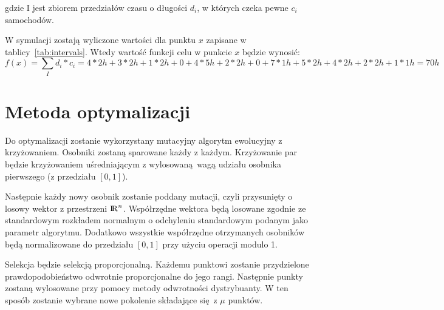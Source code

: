 \documentclass[a4paper]{article}
\begin{document}
gdzie I jest zbiorem przedziałów czasu o długości $d_i$, w których czeka pewne $c_i$
samochodów.

\begin{table}[ht]
    \centering
    \caption{Zbiór przedziałów czasowych $I$ wraz z ich długością $d_i$ oraz
    liczbą czekających samochodów $c_i$, dla punktu $x=(0.375, 0.625, 0.5)$\label{tab:intervals}.}
\end{table}

W symulacji zostają wyliczone wartości dla punktu $x$ zapisane w tablicy~\ref{tab:intervals}.
Wtedy wartość funkcji celu w punkcie $x$ będzie wynosić:
$$f(x) = \sum\limits_{I} d_i * c_i = 4*2h + 3*2h + 1*2h + 0 + 4*5h + 2*2h + 0 + 7*1h + 5*2h + 4*2h + 2*2h + 1*1h = 70h $$

\section{Metoda optymalizacji}
Do optymalizacji zostanie wykorzystany mutacyjny algorytm ewolucyjny
z krzyżowaniem. Osobniki zostaną sparowane każdy z każdym. Krzyżowanie par będzie
krzyżowaniem uśredniającym z wylosowaną wagą udziału osobnika pierwszego
(z przedziału $[0, 1]$).

Następnie każdy nowy osobnik zostanie poddany mutacji, czyli przysunięty
o losowy wektor z przestrzeni ${\rm I\!R}^n$. Współrzędne wektora będą losowane
zgodnie ze standardowym rozkładem normalnym o odchyleniu standardowym podanym
jako parametr algorytmu. Dodatkowo wszystkie współrzędne otrzymanych osobników
będą normalizowane do przedziału $[0, 1]$ przy użyciu operacji modulo 1.

Selekcja będzie selekcją proporcjonalną. Każdemu punktowi zostanie przydzielone
prawdopodobieństwo odwrotnie proporcjonalne do jego rangi. Następnie punkty
zostaną wylosowane przy pomocy metody odwrotności dystrybuanty. W ten sposób
zostanie wybrane nowe pokolenie składające się z $\mu$ punktów.
\end{document}
